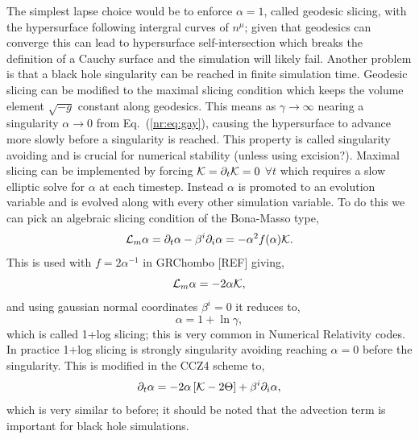 The simplest lapse choice would be to enforce $\alpha=1$, called geodesic slicing, with the hypersurface following intergral curves of $n^\mu$; given that geodesics can converge this can lead to hypersurface self-intersection which breaks the definition of a Cauchy surface and the simulation will likely fail. Another problem is that a black hole singularity can be reached in finite simulation time. Geodesic slicing can be modified to the maximal slicing condition which keeps the volume element $\sqrt{-g}$ constant along geodesics. This means as $\gamma\rightarrow\infty$ nearing a singularity $\alpha\rightarrow0$ from Eq.~(\ref{nr:eq:gay}), causing the hypersurface to advance more slowly before a singularity is reached. This property is called singularity avoiding and is crucial for numerical stability (unless using excision?). Maximal slicing can be implemented by forcing $\mathcal{K} = \partial_t \mathcal{K} = 0$ $\forall t$ which requires a slow elliptic solve for $\alpha$ at each timestep. Instead $\alpha$ is promoted to an evolution variable and is evolved along with every other simulation variable. To do this we can pick an algebraic slicing condition of the Bona-Masso type,
\begin{equation}\mathcal{L}_m \alpha = \partial_t \alpha - \beta^i \partial_i \alpha = -\alpha^2 f(\alpha)\mathcal{K}. \end{equation}
This is used with $f = 2\alpha^{-1}$ in GRChombo [REF] giving,
\begin{equation}\mathcal{L}_m \alpha = -2\alpha \mathcal{K}, \end{equation}
and using gaussian normal coordinates $\beta^i=0$ it reduces to, 
\begin{equation} \alpha = 1+ \ln \gamma,\end{equation}
which is called 1+log slicing; this is very common in Numerical Relativity codes. In practice 1+log slicing is strongly singularity avoiding reaching $\alpha=0$ before the singularity. This is modified in the CCZ4 scheme to, 
\begin{equation}\partial_t \alpha = -2\alpha\left[ \mathcal{K}-2\Theta\right] + \beta^i \partial_i \alpha,\end{equation}
which is very similar to before; it should be noted that the advection term is important for black hole simulations.

